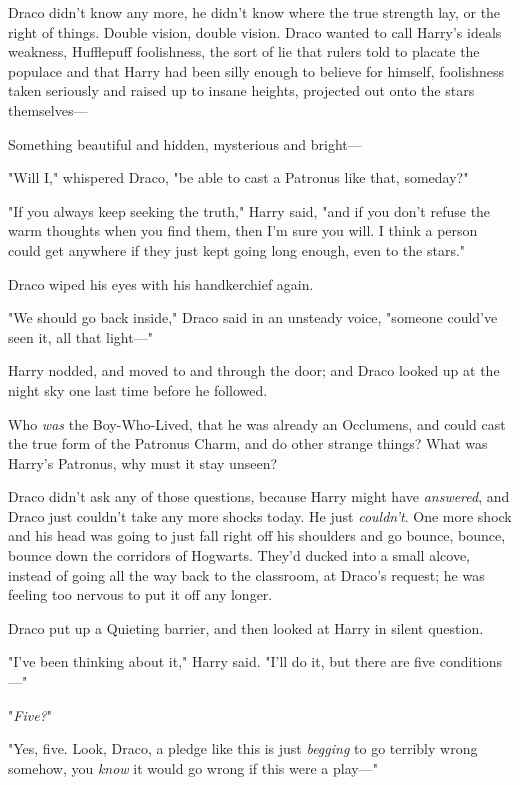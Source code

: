 Draco didn't know any more, he didn't know where the true strength lay, or the
right of things. Double vision, double vision. Draco wanted to call Harry's
ideals weakness, Hufflepuff foolishness, the sort of lie that rulers told to
placate the populace and that Harry had been silly enough to believe for
himself, foolishness taken seriously and raised up to insane heights, projected
out onto the stars themselves---

Something beautiful and hidden, mysterious and bright---

"Will I," whispered Draco, "be able to cast a Patronus like that, someday?"

"If you always keep seeking the truth," Harry said, "and if you don't refuse
the warm thoughts when you find them, then I'm sure you will. I think a person
could get anywhere if they just kept going long enough, even to the stars."

Draco wiped his eyes with his handkerchief again.

"We should go back inside," Draco said in an unsteady voice, "someone could've
seen it, all that light\mbox{---}"

Harry nodded, and moved to and through the door; and Draco looked up at the
night sky one last time before he followed.

Who \emph{was} the Boy-Who-Lived, that he was already an Occlumens, and could
cast the true form of the Patronus Charm, and do other strange things? What was
Harry's Patronus, why must it stay unseen?

Draco didn't ask any of those questions, because Harry might have
\emph{answered}, and Draco just couldn't take any more shocks today. He just
\emph{couldn't}. One more shock and his head was going to just fall right off
his shoulders and go bounce, bounce, bounce down the corridors of Hogwarts.
\sbreak
They'd ducked into a small alcove, instead of going all the way back to the
classroom, at Draco's request; he was feeling too nervous to put it off any
longer.

Draco put up a Quieting barrier, and then looked at Harry in silent question.

"I've been thinking about it," Harry said. "I'll do it, but there are five
conditions\mbox{---}"

"\emph{Five?}"

"Yes, five. Look, Draco, a pledge like this is just \emph{begging} to go
terribly wrong somehow, you \emph{know} it would go wrong if this were a
play\mbox{---}"

